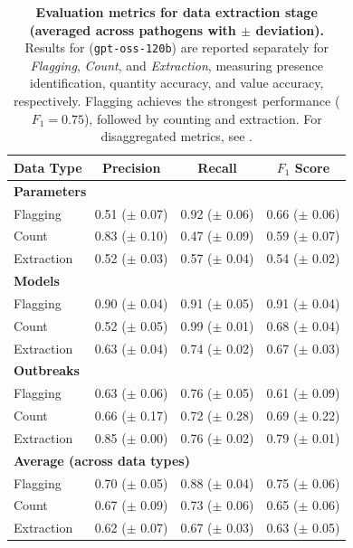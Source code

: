 \begin{table}[b!]
\centering
\caption{\textbf{Evaluation metrics for data extraction stage (averaged across pathogens with $\pm$ deviation).} Results for \name{} (\texttt{gpt-oss-120b}) are reported separately for \textit{Flagging}, \textit{Count}, and \textit{Extraction}, measuring presence identification, quantity accuracy, and value accuracy, respectively. Flagging achieves the strongest performance ($F_1 = 0.75$), followed by counting and extraction. For disaggregated metrics, see .}
\label{tab:data_extraction_metrics}
\footnotesize
\setlength{\tabcolsep}{3.5pt}
\renewcommand{\arraystretch}{0.97}
\begin{tabular}{lccc}
\toprule
\textbf{Data Type} & \textbf{Precision} & \textbf{Recall} & \textbf{$F_1$ Score} \\
\midrule
\multicolumn{4}{l}{\textbf{Parameters}} \\
\quad {}{} Flagging   & 0.51 ($\pm$ 0.07) & 0.92 ($\pm$ 0.06) & 0.66 ($\pm$ 0.06) \\
\quad \decounts{} Count      & 0.83 ($\pm$ 0.10) & 0.47 ($\pm$ 0.09) & 0.59 ($\pm$ 0.07) \\
\quad \deextraction{} Extraction & 0.52 ($\pm$ 0.03) & 0.57 ($\pm$ 0.04) & 0.54 ($\pm$ 0.02) \\

\midrule

\multicolumn{4}{l}{\textbf{Models}} \\
\quad {}{} Flagging   & 0.90 ($\pm$ 0.04) & 0.91 ($\pm$ 0.05) & 0.91 ($\pm$ 0.04) \\
\quad \decounts{} Count      & 0.52 ($\pm$ 0.05) & 0.99 ($\pm$ 0.01) & 0.68 ($\pm$ 0.04) \\
\quad \deextraction{} Extraction & 0.63 ($\pm$ 0.04) & 0.74 ($\pm$ 0.02) & 0.67 ($\pm$ 0.03) \\

\midrule

\multicolumn{4}{l}{\textbf{Outbreaks}} \\
\quad {}{} Flagging   & 0.63 ($\pm$ 0.06) & 0.76 ($\pm$ 0.05) & 0.61 ($\pm$ 0.09) \\
\quad \decounts{} Count      & 0.66 ($\pm$ 0.17) & 0.72 ($\pm$ 0.28) & 0.69 ($\pm$ 0.22) \\
\quad \deextraction{} Extraction & 0.85 ($\pm$ 0.00) & 0.76 ($\pm$ 0.02) & 0.79 ($\pm$ 0.01) \\

\midrule

\multicolumn{4}{l}{\textbf{Average (across data types)}} \\
\quad {}{} Flagging   & 0.70 ($\pm$ 0.05) & 0.88 ($\pm$ 0.04) & 0.75 ($\pm$ 0.06) \\
\quad \decounts{} Count      & 0.67 ($\pm$ 0.09) & 0.73 ($\pm$ 0.06) & 0.65 ($\pm$ 0.06) \\
\quad \deextraction{} Extraction & 0.62 ($\pm$ 0.07) & 0.67 ($\pm$ 0.03) & 0.63 ($\pm$ 0.05) \\

\bottomrule
\end{tabular}
\end{table}


